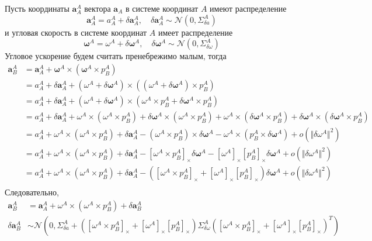 \documentclass[12pt]{article}
\begin{document}
Пусть координаты $\pmb{a}_A^A$ вектора $\pmb{a}_A$ в системе координат $A$ имеют
распределение
$$
    \pmb{a}_A^A=a_A^A+\delta \pmb{a}_A^A,
    \quad
    \delta \pmb{a}_A^A \sim \mathcal{N}(0, \Sigma_{\delta a}^A)
$$
и угловая скорость в системе координат $A$ имеет распределение
$$
    \pmb{\omega}^A=\omega^A+\delta \pmb{\omega}^A,
    \quad
    \delta \pmb{\omega}^A\sim \mathcal{N}(0, \Sigma_{\delta \omega}^A)
$$
Угловое ускорение будем считать пренебрежимо малым, тогда
$$
    \begin{aligned}
        \pmb{a}_B^A
         & =\pmb{a}_A^A+\pmb{\omega}^A \times (\pmb{\omega}^A \times p_B^A)                                                   \\
         & =a_A^A + \delta \pmb{a}_A^A
        + (\omega^A+\delta \pmb{\omega}^A) \times ((\omega^A+\delta \pmb{\omega}^A) \times p_B^A)                             \\
         & =a_A^A + \delta \pmb{a}_A^A
        + (\omega^A+\delta \pmb{\omega}^A) \times (\omega^A\times p_B^A+\delta \pmb{\omega}^A\times p_B^A)                    \\
         & =a_A^A + \delta \pmb{a}_A^A
        + \omega^A \times (\omega^A\times p_B^A)+\delta \pmb{\omega}^A \times (\omega^A\times p_B^A)
        + \omega^A\times (\delta \pmb{\omega}^A\times p_B^A)+\delta \pmb{\omega}^A \times (\delta \pmb{\omega}^A\times p_B^A) \\
         & =a_A^A + \omega^A \times (\omega^A\times p_B^A)
        + \delta \pmb{a}_A^A
        - (\omega^A\times p_B^A) \times \delta \pmb{\omega}^A
        - \omega^A\times (p_B^A \times \delta \pmb{\omega}^A)+o(\Vert \delta\omega^A\Vert^2)                                  \\
         & =a_A^A + \omega^A \times (\omega^A\times p_B^A)
        + \delta \pmb{a}_A^A
        - [\omega^A\times p_B^A]_\times \delta \pmb{\omega}^A
        - [\omega^A]_\times [p_B^A]_\times \delta \pmb{\omega}^A+o(\Vert \delta\omega^A\Vert^2)                               \\
         & =a_A^A + \omega^A \times (\omega^A\times p_B^A)
        + \delta \pmb{a}_A^A
        - ([\omega^A\times p_B^A]_\times + [\omega^A]_\times [p_B^A]_\times) \delta \pmb{\omega}^A
        +o(\Vert \delta\omega^A\Vert^2)                                                                                       \\
    \end{aligned}
$$
Следовательно,
\begin{equation}
    \begin{aligned}
        \pmb{a}_B^A        & =\pmb{a}_A^A
        + \omega^A\times (\omega^A \times p_B^A)+\delta \pmb{a}_B^A \\
        \delta \pmb{a}_B^A & \sim\mathcal{N}(
        0,
        \Sigma_{\delta a}^A
        + ([\omega^A\times p_B^A]_\times + [\omega^A]_\times [p_B^A]_\times)
        \Sigma_{\delta\omega}^A
        ([\omega^A\times p_B^A]_\times + [\omega^A]_\times [p_B^A]_\times)^T
        )
    \end{aligned}
\end{equation}
\end{document}
